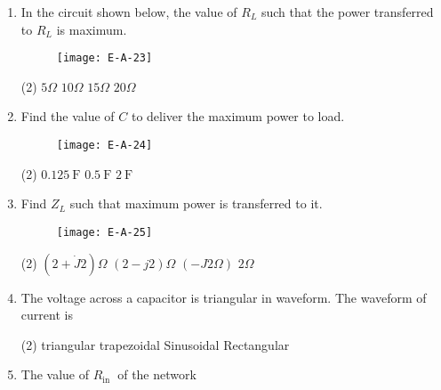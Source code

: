 \begin{enumerate}
\begin{figure}[H]
	\centering
	\texttt{[image: E-A-22]}
	\caption{}
	\label{}
\end{figure}
 \begin{tasks}(2)
	\task[\textbf{a.}]a low-pass filter
	\task[\textbf{b.}]a high-pass filter
	\task[\textbf{c.}]a band-pass filter
	\task[\textbf{d.}]a band-regeat filter 
\end{tasks}
\item In the circuit shown below, the value of $R_{L}$ such that the power transferred to $R_{L}$ is maximum.
\begin{figure}[H]
	\centering
	\texttt{[image: E-A-23]}
	\caption{}
	\label{}
\end{figure}
 \begin{tasks}(2)
	\task[\textbf{a.}]$5\Omega$
	\task[\textbf{b.}]$10\Omega$
	\task[\textbf{c.}]$15\Omega$
	\task[\textbf{d.}]$20\Omega$
\end{tasks}
\item Find the value of $C$ to deliver the maximum power to load.
\begin{figure}[H]
	\centering
	\texttt{[image: E-A-24]}
	\caption{}
	\label{}
\end{figure}
 \begin{tasks}(2)
	\task[\textbf{a.}] $0.125 \mathrm{~F}$
	\task[\textbf{b.}] $0.5 \mathrm{~F}$
	\task[\textbf{c.}]$2 \mathrm{~F}$
\end{tasks}
\item Find $Z_{L}$ such that maximum power is transferred to it.
\begin{figure}[H]
	\centering
	\texttt{[image: E-A-25]}
	\caption{}
	\label{}
\end{figure}
 \begin{tasks}(2)
	\task[\textbf{a.}]$(2+\dot{J} 2) \Omega$
	\task[\textbf{b.}] $(2-j 2) \Omega$
	\task[\textbf{c.}]$(-J 2 \Omega)$
	\task[\textbf{d.}] $2 \Omega$
\end{tasks}
\item The voltage across a capacitor is triangular in waveform. The waveform of current is
 \begin{tasks}(2)
	\task[\textbf{a.}]triangular
	\task[\textbf{b.}]trapezoidal
	\task[\textbf{c.}]Sinusoidal
	\task[\textbf{d.}] Rectangular 
\end{tasks}
\item The value of $R_{\text {in }}$ of the network
\begin{figure}[H]

\end{figure}
\end{enumerate}
